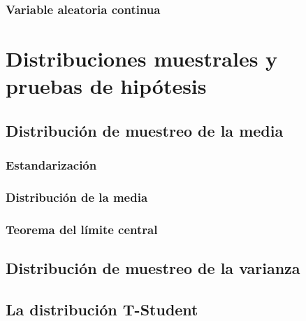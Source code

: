 \documentclass[
]{book}
\begin{document}
\hypertarget{variable-aleatoria-continua-2}{%
\subsection{Variable aleatoria continua}\label{variable-aleatoria-continua-2}}

\hypertarget{distribuciones-muestrales-y-pruebas-de-hipuxf3tesis}{%
\chapter{Distribuciones muestrales y pruebas de hipótesis}\label{distribuciones-muestrales-y-pruebas-de-hipuxf3tesis}}

\hypertarget{distribuciuxf3n-de-muestreo-de-la-media}{%
\section{Distribución de muestreo de la media}\label{distribuciuxf3n-de-muestreo-de-la-media}}

\hypertarget{estandarizaciuxf3n}{%
\subsection{Estandarización}\label{estandarizaciuxf3n}}

\hypertarget{distribuciuxf3n-de-la-media}{%
\subsection{Distribución de la media}\label{distribuciuxf3n-de-la-media}}

\hypertarget{teorema-del-luxedmite-central}{%
\subsection{Teorema del límite central}\label{teorema-del-luxedmite-central}}

\hypertarget{distribuciuxf3n-de-muestreo-de-la-varianza}{%
\section{Distribución de muestreo de la varianza}\label{distribuciuxf3n-de-muestreo-de-la-varianza}}

\hypertarget{la-distribuciuxf3n-t-student}{%
\section{La distribución T-Student}\label{la-distribuciuxf3n-t-student}}
\end{document}
